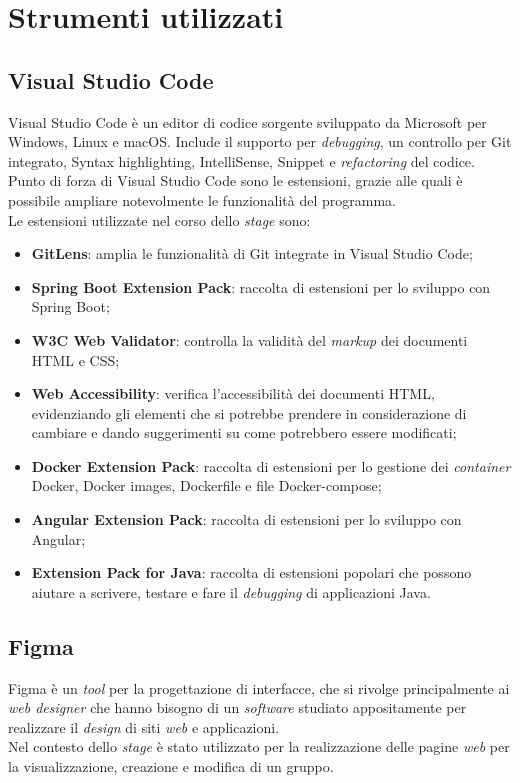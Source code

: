 \section{Strumenti utilizzati}
\subsection{Visual Studio Code}
Visual Studio Code è un editor di codice sorgente sviluppato da Microsoft per
Windows, Linux e macOS.
Include il supporto per \textit{debugging}, un controllo per Git integrato,
Syntax highlighting, IntelliSense,
Snippet e \textit{refactoring} del codice.\\
Punto di forza di Visual Studio Code sono le estensioni, grazie alle quali è
possibile ampliare
notevolmente le funzionalità del programma.\\
Le estensioni utilizzate nel corso dello \textit{stage} sono:
\begin{itemize}
      \item \textbf{GitLens}: amplia le funzionalità di Git integrate in
            Visual Studio Code;
      \item \textbf{Spring Boot Extension Pack}: raccolta di estensioni per
            lo sviluppo con Spring Boot;
      \item \textbf{W3C Web Validator}: controlla la validità del
            \textit{markup} dei documenti HTML e CSS;
      \item \textbf{Web Accessibility}: verifica l'accessibilità dei
            documenti HTML, evidenziando gli elementi che si potrebbe prendere
            in
            considerazione di cambiare e dando suggerimenti su come potrebbero
            essere
            modificati;
      \item \textbf{Docker Extension Pack}: raccolta di estensioni per lo
            gestione dei \textit{container} Docker, Docker images, Dockerfile e
            file
            Docker-compose;
      \item \textbf{Angular Extension Pack}: raccolta di estensioni per lo
            sviluppo con Angular;
      \item \textbf{Extension Pack for Java}: raccolta di estensioni popolari
            che possono aiutare a scrivere, testare e fare il
            \textit{debugging} di applicazioni Java.
\end{itemize}
\subsection{Figma}
\label{sub:Figma}
Figma è un \textit{tool} per la progettazione di interfacce, che si rivolge
principalmente ai \textit{web designer} che hanno bisogno di un
\textit{software} studiato appositamente per realizzare il \textit{design} di
siti \textit{web} e applicazioni.\\
Nel contesto dello \textit{stage} è stato utilizzato per la realizzazione delle
pagine \textit{web} per la visualizzazione, creazione e modifica di un gruppo.
